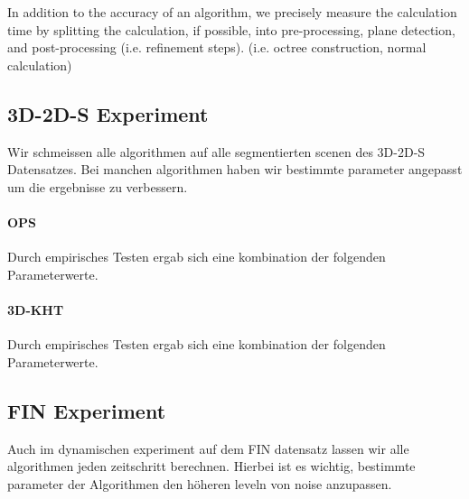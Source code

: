 \documentclass[main.tex]{subfiles}
\begin{document}
In addition to the accuracy of an algorithm, we precisely measure the calculation time by splitting the calculation, if possible,
into pre-processing, plane detection, and post-processing (i.e. refinement steps).
(i.e. octree construction, normal calculation)



\subsection{3D-2D-S Experiment}
Wir schmeissen alle algorithmen auf alle segmentierten scenen des 3D-2D-S Datensatzes. Bei manchen algorithmen haben wir bestimmte parameter
angepasst um die ergebnisse zu verbessern.

\paragraph{OPS}
Durch empirisches Testen ergab sich eine kombination der folgenden Parameterwerte.
\begin{table}[H]
    \centering
    \caption{}
    \label{tab:3d2ds-ops}
\end{table}

\paragraph{3D-KHT}
Durch empirisches Testen ergab sich eine kombination der folgenden Parameterwerte.
\begin{table}[H]
    \centering
    \caption{}
    \label{tab:3d2ds-3dkht}
\end{table}


\subsection{FIN Experiment}
Auch im dynamischen experiment auf dem FIN datensatz lassen wir alle algorithmen jeden zeitschritt berechnen.
Hierbei ist es wichtig, bestimmte parameter der Algorithmen den höheren leveln von noise anzupassen.
\end{document}
